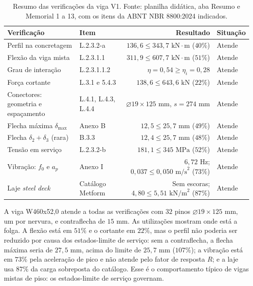 \documentclass[11pt,a4paper]{article}
\begin{document}
\begin{table}[!htbp]
  \centering
  \caption{Resumo das verificações da viga V1. Fonte: planilha didática, aba Resumo e Memorial 1 a 13, com os itens da ABNT NBR 8800:2024 indicados.}
  \label{tab:sintese}
  \small
  \begin{tabularx}{\linewidth}{Xlrl}
    \toprule
    \textbf{Verificação} & \textbf{Item} & \textbf{Resultado} & \textbf{Situação} \\
    \midrule
    Perfil na concretagem & L.2.3.2-a & $136{,}6 \le 343{,}7\text{ kN}\cdot\text{m}$ ($40\%$) & Atende \\
    Flexão da viga mista & L.2.3.1.1 & $311{,}9 \le 607{,}7\text{ kN}\cdot\text{m}$ ($51\%$) & Atende \\
    Grau de interação & L.2.3.1.1.2 & $\eta = 0{,}54 \ge \eta_i = 0{,}28$ & Atende \\
    Força cortante & L.3.1 e 5.4.3 & $138{,}6 \le 643{,}6\text{ kN}$ ($22\%$) & Atende \\
    Conectores: geometria e espaçamento & L.4.1, L.4.3, L.4.4 & $\varnothing 19 \times 125\text{ mm}$, $s = 274\text{ mm}$ & Atende \\
    Flecha máxima $\delta_{\max}$ & Anexo B & $12{,}5 \le 25{,}7\text{ mm}$ ($49\%$) & Atende \\
    Flecha $\delta_2 + \delta_3$ (rara) & B.3.3 & $12{,}4 \le 25{,}7\text{ mm}$ ($48\%$) & Atende \\
    Tensão em serviço & L.2.3.2-b & $181{,}1 \le 345\text{ MPa}$ ($52\%$) & Atende \\
    Vibração: $f_0$ e $a_p$ & Anexo I & $6{,}72\text{ Hz}$; $0{,}037 \le 0{,}050\text{ m/s}^2$ ($73\%$) & Atende \\
    Laje \textit{steel deck} & Catálogo Metform & Sem escoras; $4{,}80 \le 5{,}51\text{ kN/m}^2$ ($87\%$) & Atende \\
    \bottomrule
  \end{tabularx}
\end{table}

A viga W460x52,0 atende a todas as verificações com $32$ pinos $\varnothing 19 \times 125\text{ mm}$, um por nervura, e contraflecha de $15\text{ mm}$. As utilizações mostram onde está a folga. A flexão está em $51\%$ e o cortante em $22\%$, mas o perfil não poderia ser reduzido por causa dos estados-limite de serviço: sem a contraflecha, a flecha máxima seria de $27{,}5\text{ mm}$, acima do limite de $25{,}7\text{ mm}$ ($107\%$); a vibração está em $73\%$ pela aceleração de pico e não atende pelo fator de resposta $R$; e a laje usa $87\%$ da carga sobreposta do catálogo. Esse é o comportamento típico de vigas mistas de piso: os estados-limite de serviço governam.
\end{document}
